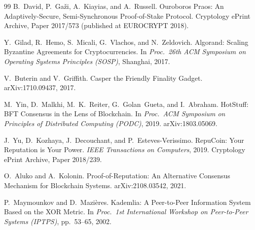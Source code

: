 \documentclass[11pt,a4paper]{article}
\begin{document}
\begin{thebibliography}{99}
 B.~David, P.~Ga\v{z}i, A.~Kiayias, and A.~Russell. Ouroboros Praos: An Adaptively-Secure, Semi-Synchronous Proof-of-Stake Protocol. Cryptology ePrint Archive, Paper 2017/573 (published at EUROCRYPT 2018).

 Y.~Gilad, R.~Hemo, S.~Micali, G.~Vlachos, and N.~Zeldovich. Algorand: Scaling Byzantine Agreements for Cryptocurrencies. In \emph{Proc.\ 26th ACM Symposium on Operating Systems Principles (SOSP)}, Shanghai, 2017.

 V.~Buterin and V.~Griffith. Casper the Friendly Finality Gadget. arXiv:1710.09437, 2017.

 M.~Yin, D.~Malkhi, M.~K.~Reiter, G.~Golan~Gueta, and I.~Abraham. HotStuff: BFT Consensus in the Lens of Blockchain. In \emph{Proc.\ ACM Symposium on Principles of Distributed Computing (PODC)}, 2019. arXiv:1803.05069.

 J.~Yu, D.~Kozhaya, J.~Decouchant, and P.~Esteves-Verissimo. RepuCoin: Your Reputation is Your Power. \emph{IEEE Transactions on Computers}, 2019. Cryptology ePrint Archive, Paper 2018/239.

 O.~Aluko and A.~Kolonin. Proof-of-Reputation: An Alternative Consensus Mechanism for Blockchain Systems. arXiv:2108.03542, 2021.

 P.~Maymounkov and D.~Mazi\`eres. Kademlia: A Peer-to-Peer Information System Based on the XOR Metric. In \emph{Proc.\ 1st International Workshop on Peer-to-Peer Systems (IPTPS)}, pp.\ 53--65, 2002.

\end{thebibliography}
\end{document}
